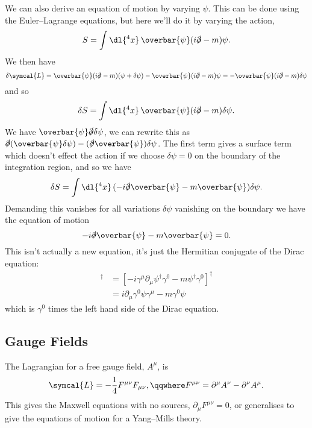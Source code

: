 \documentclass[fleqn]{NotesClass}
\newcommand{\hermit}{\dagger}
\newcommand{\diracadjoint}[1]{\overbar{#1}}
\newcommand{\lagrangianDensity}{\symcal{L}}
\begin{document}
    We can also derive an equation of motion by varying \(\psi\).
    This can be done using the Euler--Lagrange equations, but here we'll do it by varying the action,
    \begin{equation}
        S = \int \dl{^4x} \, \diracadjoint{\psi}(i\slashed{\partial} - m)\psi.
    \end{equation}
    We then have
    \begin{equation}
        \delta \lagrangianDensity = \diracadjoint{\psi}(i\slashed{\partial} - m)(\psi + \delta\psi) - \diracadjoint{\psi}(i\slashed{\partial} - m)\psi = -\diracadjoint{\psi}(i\slashed{\partial} - m)\delta\psi
    \end{equation}
    and so
    \begin{equation}
        \delta S = \int \dl{^4x} \, \diracadjoint{\psi}(i\slashed{\partial} - m)\delta\psi.
    \end{equation}
    We have \(\diracadjoint{\psi}\slashed{\partial} \delta \psi\), we can rewrite this as \(\slashed{\partial}(\diracadjoint{\psi}\delta\psi) - (\slashed{\partial}\diracadjoint{\psi})\delta\psi\).
    The first term gives a surface term which doesn't effect the action if we choose \(\delta\psi = 0\) on the boundary of the integration region, and so we have
    \begin{equation}
        \delta S = \int \dl{^4x} \, (-i\slashed{\partial}\diracadjoint{\psi} - m\diracadjoint{\psi})\delta\psi.
    \end{equation}
    Demanding this vanishes for all variations \(\delta \psi\) vanishing on the boundary we have the equation of motion
    \begin{equation}
        -i\slashed{\partial}\diracadjoint{\psi} - m\diracadjoint{\psi} = 0.
    \end{equation}
    This isn't actually a new equation, it's just the Hermitian conjugate of the Dirac equation:
    \begin{align}
        [-i\slashed{\partial}\diracadjoint{\psi} - m\diracadjoint{\psi}]^\hermit &= [-i\gamma^\mu \partial_\mu \psi^\hermit \gamma^0 - m\psi^\hermit \gamma^0]^\hermit\\
        &= i\partial_\mu \gamma^0 \psi \gamma^\mu - m \gamma^0 \psi
    \end{align}
    which is \(\gamma^0\) times the left hand side of the Dirac equation.
    
    \subsection{Gauge Fields}
    The Lagrangian for a free gauge field, \(A^\mu\), is
    \begin{equation}
        \lagrangianDensity = -\frac{1}{4} F^{\mu\nu}F_{\mu\nu}, \qqwhere F^{\mu\nu} = \partial^\mu A^\nu - \partial^\nu A^\mu.
    \end{equation}
    This gives the Maxwell equations with no sources, \(\partial_\mu F^{\mu\nu} = 0\), or generalises to give the equations of motion for a Yang--Mills theory.
    
\end{document}
